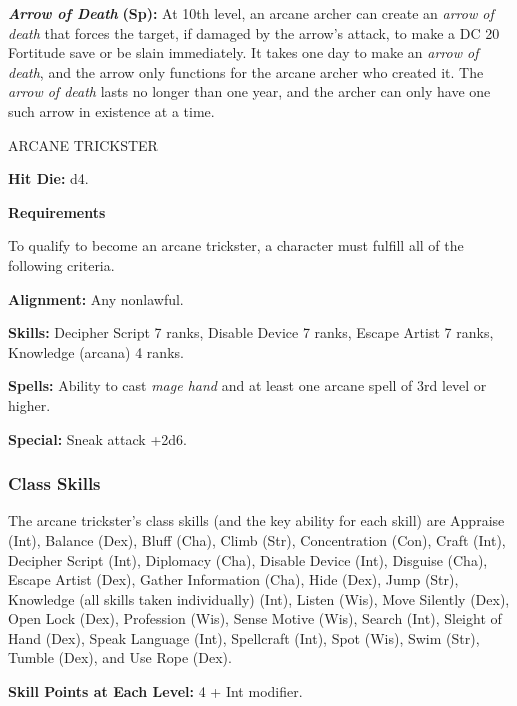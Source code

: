 \documentclass{article}
\begin{document}
\textit{\textbf{Arrow of Death }}\textbf{(Sp):} At 10th level, an arcane archer 
can create an \textit{arrow of death }that forces the target, if damaged by the 
arrow's attack, to make a DC 20 Fortitude save or be slain immediately. It takes 
one day to make an \textit{arrow of death}, and the arrow only functions for the 
arcane archer who created it. The \textit{arrow of death }lasts no longer than 
one year, and the archer can only have one such arrow in existence at a time.

\vspace{12pt}
ARCANE TRICKSTER

\textbf{Hit Die:} d4.

\textbf{Requirements}

To qualify to become an arcane trickster, a character must fulfill all of the following 
criteria.

\textbf{Alignment:} Any nonlawful.

\textbf{Skills:} Decipher Script 7 ranks, Disable Device 7 ranks, Escape Artist 
7 ranks, Knowledge (arcana) 4 ranks.

\textbf{Spells:} Ability to cast \textit{mage hand }and at least one arcane spell 
of 3rd level or higher.

\textbf{Special:} Sneak attack +2d6.

\subsubsection*{\textbf{Class Skills}}

The arcane trickster's class skills (and the key ability for each skill) are Appraise 
(Int), Balance (Dex), Bluff (Cha), Climb (Str), Concentration (Con), Craft (Int), 
Decipher Script (Int), Diplomacy (Cha), Disable Device (Int), Disguise (Cha), Escape 
Artist (Dex), Gather Information (Cha), Hide (Dex), Jump (Str), Knowledge (all 
skills taken individually) (Int), Listen (Wis), Move Silently (Dex), Open Lock 
(Dex), Profession (Wis), Sense Motive (Wis), Search (Int), Sleight of Hand (Dex), 
Speak Language (Int), Spellcraft (Int), Spot (Wis), Swim (Str), Tumble (Dex), and 
Use Rope (Dex).

\textbf{Skill Points at Each Level:} 4 + Int modifier.
\end{document}
